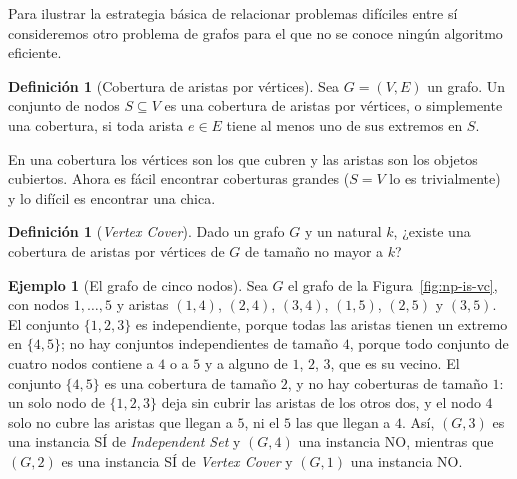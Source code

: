 \documentclass[12pt, spanish, oneside, openany]{book}
\newcommand{\prob}[1]{\textit{#1}}
\newcommand{\IS}{\prob{Independent Set}\xspace}
\newcommand{\VC}{\prob{Vertex Cover}\xspace}
\theoremstyle{uprightplain}
\theoremstyle{definition}
\newtheorem{definicion}[teorema]{Definición}
\newtheorem{ejemplo}[teorema]{Ejemplo}
\theoremstyle{remark}
\theoremstyle{definition}
\begin{document}
Para ilustrar la estrategia básica de relacionar problemas difíciles entre sí consideremos otro problema de grafos para el que no se conoce ningún algoritmo eficiente.

\begin{definicion}[Cobertura de aristas por vértices]
\label{def:np-cobertura}
Sea $G=(V,E)$ un grafo. Un conjunto de nodos $S\subseteq V$ es una cobertura de aristas por vértices, o simplemente una cobertura, si toda arista $e\in E$ tiene al menos uno de sus extremos en $S$.
\end{definicion}

En una cobertura los vértices son los que cubren y las aristas son los objetos cubiertos. Ahora es fácil encontrar coberturas grandes ($S=V$ lo es trivialmente) y lo difícil es encontrar una chica.

\begin{definicion}[\VC]
\label{def:np-vc}
Dado un grafo $G$ y un natural $k$, ¿existe una cobertura de aristas por vértices de $G$ de tamaño no mayor a $k$?
\end{definicion}

\begin{ejemplo}[El grafo de cinco nodos]
\label{ej:np-diamante}
Sea $G$ el grafo de la Figura~\ref{fig:np-is-vc}, con nodos $1,\dots,5$ y aristas $(1,4)$, $(2,4)$, $(3,4)$, $(1,5)$, $(2,5)$ y $(3,5)$. El conjunto $\{1,2,3\}$ es independiente, porque todas las aristas tienen un extremo en $\{4,5\}$; no hay conjuntos independientes de tamaño $4$, porque todo conjunto de cuatro nodos contiene a $4$ o a $5$ y a alguno de $1$, $2$, $3$, que es su vecino. El conjunto $\{4,5\}$ es una cobertura de tamaño $2$, y no hay coberturas de tamaño $1$: un solo nodo de $\{1,2,3\}$ deja sin cubrir las aristas de los otros dos, y el nodo $4$ solo no cubre las aristas que llegan a $5$, ni el $5$ las que llegan a $4$. Así, $(G,3)$ es una instancia SÍ de \IS y $(G,4)$ una instancia NO, mientras que $(G,2)$ es una instancia SÍ de \VC y $(G,1)$ una instancia NO.
\end{ejemplo}
\end{document}
